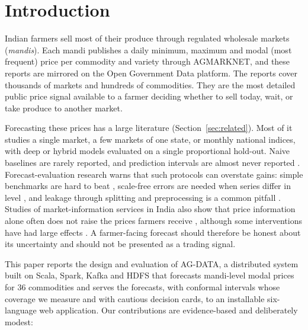\section{Introduction}\label{sec:intro}

Indian farmers sell most of their produce through regulated wholesale markets (\emph{mandis}).
Each mandi publishes a daily minimum, maximum and modal (most frequent) price per commodity and variety through
AGMARKNET, and these reports are mirrored on the Open Government Data platform. The reports cover thousands of markets and hundreds of commodities.
They are the most detailed public price signal available to a farmer deciding whether to sell today, wait,
or take produce to another market.

Forecasting these prices has a large literature (Section~\ref{sec:related}). Most of it studies a single market, a few markets of one state, or monthly national indices,
with deep or hybrid models evaluated on a single proportional hold-out. Naive baselines are rarely reported, and prediction intervals are almost never reported
\cite{paul2022brinjal,manogna2025deep,paul2025deep,kumar2021onion}.
Forecast-evaluation research warns that such protocols can overstate gains: simple benchmarks are hard to beat
\cite{makridakis2020m4,makridakis2022m5}, scale-free errors are needed when series differ in level
\cite{hyndman2006another}, and leakage through splitting and preprocessing is a common pitfall
\cite{hewamalage2022pitfalls,cerqueira2020evaluating}.
Studies of market-information services in India also show that price information alone often does not raise the
prices farmers receive \cite{fafchamps2012sms,mitra2018asymmetric}, although some interventions have
had large effects \cite{jensen2007digital,goyal2010information}. A farmer-facing forecast should therefore be
honest about its uncertainty and should not be presented as a trading signal.

This paper reports the design and evaluation of AG-DATA, a distributed system built on Scala, Spark, Kafka and HDFS that
forecasts mandi-level modal prices for 36 commodities and serves the forecasts, with conformal intervals whose coverage we measure and with cautious decision cards,
to an installable six-language web application. Our contributions are evidence-based and deliberately modest:

